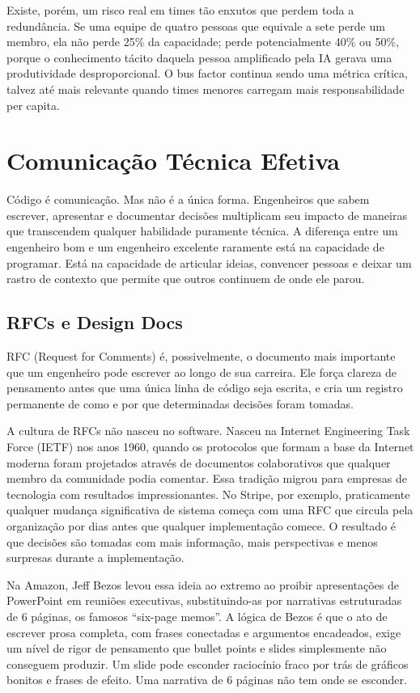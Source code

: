 Existe, porém, um risco real em times tão enxutos que perdem toda a
redundância. Se uma equipe de quatro pessoas que equivale a sete perde um
membro, ela não perde 25\% da capacidade; perde potencialmente 40\% ou
50\%, porque o conhecimento tácito daquela pessoa amplificado pela IA gerava
uma produtividade desproporcional. O bus factor continua sendo uma métrica
crítica, talvez até mais relevante quando times menores carregam mais
responsabilidade per capita.

\section{Comunicação Técnica Efetiva}

Código é comunicação. Mas não é a única forma. Engenheiros que sabem escrever,
apresentar e documentar decisões multiplicam seu impacto de maneiras que
transcendem qualquer habilidade puramente técnica. A diferença entre um
engenheiro bom e um engenheiro excelente raramente está na capacidade de
programar. Está na capacidade de articular ideias, convencer pessoas e
deixar um rastro de contexto que permite que outros continuem de onde ele parou.

\subsection{RFCs e Design Docs}

RFC (Request for Comments) é, possivelmente, o documento mais importante que
um engenheiro pode escrever ao longo de sua carreira. Ele força clareza de
pensamento antes que uma única linha de código seja escrita, e cria um
registro permanente de como e por que determinadas decisões foram tomadas.

A cultura de RFCs não nasceu no software. Nasceu na Internet Engineering
Task Force (IETF) nos anos 1960, quando os protocolos que formam a base da
Internet moderna foram projetados através de documentos colaborativos que
qualquer membro da comunidade podia comentar. Essa tradição migrou para
empresas de tecnologia com resultados impressionantes. No Stripe, por exemplo,
praticamente qualquer mudança significativa de sistema começa com uma RFC que
circula pela organização por dias antes que qualquer implementação comece. O
resultado é que decisões são tomadas com mais informação, mais perspectivas
e menos surpresas durante a implementação.

Na Amazon, Jeff Bezos levou essa ideia ao extremo ao proibir apresentações de
PowerPoint em reuniões executivas, substituindo-as por narrativas estruturadas
de 6 páginas, os famosos ``six-page memos''. A lógica de Bezos é que o ato
de escrever prosa completa, com frases conectadas e argumentos encadeados,
exige um nível de rigor de pensamento que bullet points e slides simplesmente
não conseguem produzir. Um slide pode esconder raciocínio fraco por trás de
gráficos bonitos e frases de efeito. Uma narrativa de 6 páginas não tem onde
se esconder.

